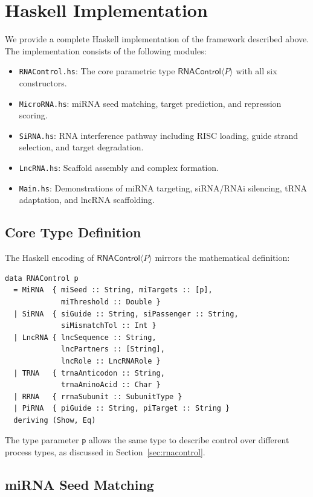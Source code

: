 \documentclass[12pt,a4paper]{article}
\theoremstyle{definition}
\newcommand{\RNAType}{\mathsf{RNAControl}}
\begin{document}
\section{Haskell Implementation}\label{sec:haskell}

We provide a complete Haskell implementation of the framework described
above.  The implementation consists of the following modules:

\begin{itemize}
  \item \texttt{RNAControl.hs}: The core parametric type
    $\RNAType\langle P\rangle$ with all six constructors.
  \item \texttt{MicroRNA.hs}: miRNA seed matching, target prediction,
    and repression scoring.
  \item \texttt{SiRNA.hs}: RNA interference pathway including RISC
    loading, guide strand selection, and target degradation.
  \item \texttt{LncRNA.hs}: Scaffold assembly and complex formation.
  \item \texttt{Main.hs}: Demonstrations of miRNA targeting, siRNA/RNAi
    silencing, tRNA adaptation, and lncRNA scaffolding.
\end{itemize}

\subsection{Core Type Definition}

The Haskell encoding of $\RNAType\langle P\rangle$ mirrors the
mathematical definition:

\begin{lstlisting}
data RNAControl p
  = MiRNA  { miSeed :: String, miTargets :: [p],
             miThreshold :: Double }
  | SiRNA  { siGuide :: String, siPassenger :: String,
             siMismatchTol :: Int }
  | LncRNA { lncSequence :: String,
             lncPartners :: [String],
             lncRole :: LncRNARole }
  | TRNA   { trnaAnticodon :: String,
             trnaAminoAcid :: Char }
  | RRNA   { rrnaSubunit :: SubunitType }
  | PiRNA  { piGuide :: String, piTarget :: String }
  deriving (Show, Eq)
\end{lstlisting}

The type parameter \texttt{p} allows the same type to describe
control over different process types, as discussed in
Section~\ref{sec:rnacontrol}.

\subsection{miRNA Seed Matching}
\end{document}
